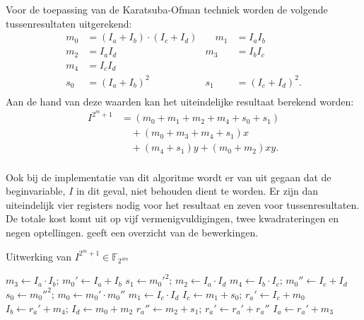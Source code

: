Voor de toepassing van de Karatsuba-Ofman techniek worden de volgende tussenresultaten uitgerekend:
\[\begin{aligned}
m_0	&= (I_a + I_b) \cdot (I_c + I_d)
			&\quad m_1	&= I_a I_b\\
m_2	&= I_a I_d
			&m_3	&= I_b I_c\\
m_4	&= I_c I_d\\
s_0	&= (I_a + I_b)^2
			&s_1	&= (I_c + I_d)^2.\\
\end{aligned}\]
Aan de hand van deze waarden kan het uiteindelijke resultaat berekend worden:
\[\begin{aligned}
I^{2^m + 1}	&= (m_0 + m_1 + m_2 + m_4 + s_0 + s_1)\\
				&\quad + (m_0 + m_3 + m_4 + s_1) x \\
				&\quad + (m_4 + s_1) y + (m_0 + m_2) xy.\\
\end{aligned}\]

Ook bij de implementatie van dit algoritme wordt er van uit gegaan dat de beginvariable, $I$ in dit geval, niet behouden dient te worden. Er zijn dan uiteindelijk vier registers nodig voor het resultaat en zeven voor tussenresultaten. De totale kost komt uit op vijf vermenigvuldigingen, twee kwadrateringen en negen optellingen.  geeft een overzicht van de bewerkingen.


\begin{algorithm}[h]
	\caption{Uitwerking van $I^{2^m + 1} \in \mathbb{F}_{2^{4m}}$}
	\label{algoritme-implementatie-miller-v-power}
	$m_3 \leftarrow I_a \cdot I_b$; $m_0' \leftarrow I_a + I_b$\;
	$s_1 \leftarrow m_0'^2$; $m_2 \leftarrow I_a \cdot I_d$\;
	$m_4 \leftarrow I_b \cdot I_c$; $m_0'' \leftarrow I_c + I_d$\;
	$s_0 \leftarrow m_0''^2$; $m_0 \leftarrow m_0' \cdot m_0''$\;
	$m_1 \leftarrow I_c \cdot I_d$\;
	$I_c \leftarrow m_1 + s_0$; $r_a' \leftarrow I_c + m_0$\;
	$I_b \leftarrow r_a' + m_4$; $I_d \leftarrow m_0 + m_2$\;
	$r_a'' \leftarrow m_2 + s_1$; $r_a' \leftarrow r_a' + r_a''$\;
	$I_a \leftarrow r_a' + m_3$\;
\end{algorithm}

